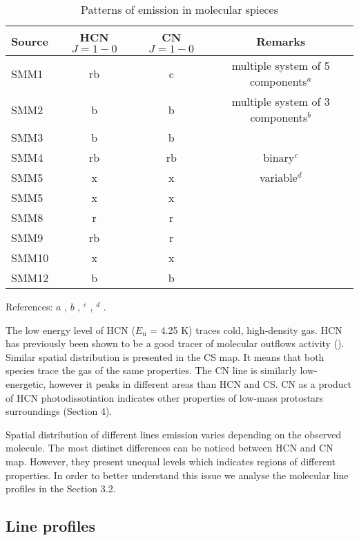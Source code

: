\documentclass{aa}
\begin{document}
\begin{table*}
\caption{Patterns of emission in molecular spieces}             %
\label{table:outflows}      %
\centering                          %
\begin{tabular}{l c c c} 
\hline\hline 
Source & HCN $J=1-0$ & CN $J=1-0$ & Remarks \\
\hline  
SMM1 & rb & c & multiple system of 5 components$^a$\\
SMM2 & b & b & multiple system of 3 components$^b$ \\ 
SMM3 & b & b & \\  
SMM4 & rb & rb & binary$^c$ \\ 
SMM5 & x & x & variable$^d$ \\ 
SMM5 & x & x & \\
SMM8 & r & r & \\
SMM9 & rb & r & \\ 
SMM10 & x & x & \\  
SMM12 & b & b & \\
\hline
\end{tabular}
\begin{flushleft}
References: $a$ \cite{Hul17}, $b$ \cite{Fra19}, $^c$ \cite{Aso18}, $^d$ \cite{Yoo17}.\\
\end{flushleft}
\end{table*}

The low energy level of HCN ($E_\mathrm{u}$ = 4.25 K) traces cold, high-density gas. HCN has previously been shown to be a good tracer of molecular outflows activity (\citealt{Wal14}). Similar spatial distribution is presented in the CS map. It means that both species trace the gas of the same properties. The CN line is similarly low-energetic, however it peaks in different areas than HCN and CS. CN as a product of HCN photodissotiation indicates other properties of low-mass protostars surroundings (Section 4).

Spatial distribution of different lines emission varies depending on the observed molecule. The most distinct differences can be noticed between HCN and CN map. However, they present unequal levels which indicates regions of different properties. In order to better understand this issue we analyse the molecular line profiles in the Section 3.2. 



\subsection{Line profiles}
\end{document}
